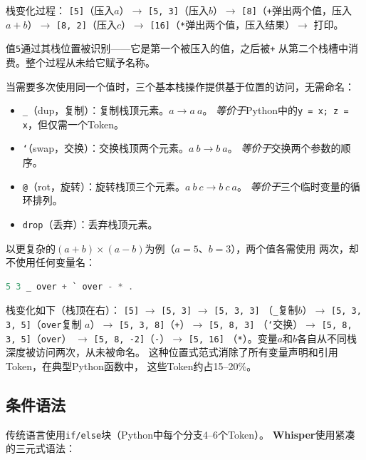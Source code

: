 \documentclass[11pt,a4paper]{ctexart}
\begin{document}
栈变化过程：
\texttt{[5]}（压入$a$）$\rightarrow$
\texttt{[5, 3]}（压入$b$）$\rightarrow$
\texttt{[8]}（\texttt{+}弹出两个值，压入$a+b$）$\rightarrow$
\texttt{[8, 2]}（压入$c$）$\rightarrow$
\texttt{[16]}（\texttt{*}弹出两个值，压入结果）$\rightarrow$ 打印。

值\texttt{5}通过其栈位置被识别——它是第一个被压入的值，之后被\texttt{+}
从第二个栈槽中消费。整个过程从未给它赋予名称。

当需要多次使用同一个值时，三个基本栈操作提供基于位置的访问，无需命名：

\begin{itemize}
\item \texttt{\_}（dup，复制）：复制栈顶元素。$a \rightarrow a\ a$。
  \textit{等价于}Python中的\texttt{y = x; z = x}，但仅需一个Token。
\item \texttt{`}（swap，交换）：交换栈顶两个元素。$a\ b \rightarrow b\ a$。
  \textit{等价于}交换两个参数的顺序。
\item \texttt{@}（rot，旋转）：旋转栈顶三个元素。$a\ b\ c \rightarrow b\ c\ a$。
  \textit{等价于}三个临时变量的循环排列。
\item \texttt{drop}（丢弃）：丢弃栈顶元素。
\end{itemize}

以更复杂的$(a + b) \times (a - b)$为例（$a = 5$、$b = 3$），两个值各需使用
两次，却不使用任何变量名：

\begin{lstlisting}[language=C,basicstyle=\ttfamily\small]
5 3 _ over + ` over - * .
\end{lstlisting}

栈变化如下（栈顶在右）：
\texttt{[5]} $\rightarrow$ \texttt{[5, 3]} $\rightarrow$ \texttt{[5, 3, 3]}
（\texttt{\_}复制$b$）$\rightarrow$ \texttt{[5, 3, 3, 5]}（\texttt{over}复制
$a$）$\rightarrow$ \texttt{[5, 3, 8]}（\texttt{+}）$\rightarrow$ \texttt{[5, 8, 3]}
（\texttt{`}交换）$\rightarrow$ \texttt{[5, 8, 3, 5]}（\texttt{over}）
$\rightarrow$ \texttt{[5, 8, -2]}（\texttt{-}）$\rightarrow$ \texttt{[5, 16]}
（\texttt{*}）。变量$a$和$b$各自从不同栈深度被访问两次，从未被命名。
这种位置式范式消除了所有变量声明和引用Token，在典型Python函数中，
这些Token约占15--20\%。

\subsection{条件语法}

传统语言使用\texttt{if/else}块（Python中每个分支4--6个Token）。
\textbf{Whisper}使用紧凑的三元式语法：
\end{document}
